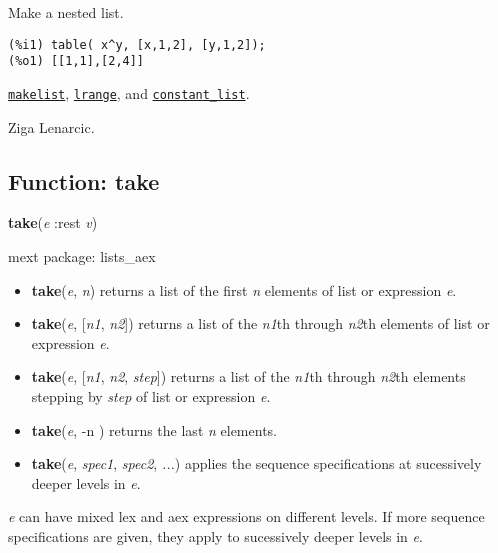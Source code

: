 \documentclass[]{article}
\begin{document}
   Make a nested list. 

\begin{Verbatim}[frame=single]
(%i1) table( x^y, [x,1,2], [y,1,2]);
(%o1) [[1,1],[2,4]]
\end{Verbatim}


  \hyperlink{makelist}{{\tt makelist}}, \hyperlink{lrange}{{\tt lrange}}, and \hyperlink{constant_list}{{\tt constant\_list}}.

\vspace{5 pt}


Ziga Lenarcic.

\vspace{5 pt}


\subsection{Function: take\label{sec:take}}
\hypertarget{take}{}
{\bf take}({\it e} :rest {\it v})


\noindent mext package: lists\_aex



\vspace{5 pt}
\begin{itemize}
\item[] {\bf take}({\it e}, {\it n})
  returns a list of the first {\it n} elements of list or expression {\it e}. 

\item[] {\bf take}({\it e}, [{\it n1}, {\it n2}])
  returns a list of the {\it n1}th through {\it n2}th elements of list or expression {\it e}. 

\item[] {\bf take}({\it e}, [{\it n1}, {\it n2}, {\it step}])
  returns a list of the {\it n1}th through {\it n2}th elements stepping by {\it step} of list or expression {\it e}. 

\item[] {\bf take}({\it e}, -n )
  returns the last {\it n} elements. 

\item[] {\bf take}({\it e}, {\it spec1}, {\it spec2}, {\it ...})
  applies the sequence specifications at sucessively deeper levels in {\it e}. 

\end{itemize}
{\it e} can have mixed lex and aex expressions on different levels. If more sequence specifications are given, they apply to sucessively deeper levels in {\it e}. 
\end{document}
